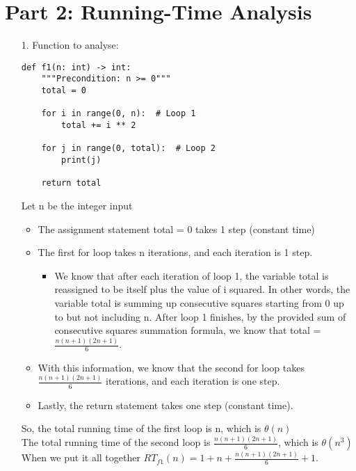 \documentclass[11pt]{article}
\begin{document}
\newpage


\section*{Part 2: Running-Time Analysis}

\begin{enumerate}
\item[1.]
Function to analyse:

\begin{verbatim}
def f1(n: int) -> int:
    """Precondition: n >= 0"""
    total = 0

    for i in range(0, n):  # Loop 1
        total += i ** 2

    for j in range(0, total):  # Loop 2
        print(j)

    return total
\end{verbatim}

Let n be the integer input 
\begin{itemize}
  \item The assignment statement total = 0 takes 1 step (constant time)
  \item The first for loop takes n iterations, and each iteration is 1 step. 
  \begin{itemize}
      \item We know that after each iteration of loop 1, the variable total is reassigned to be itself plus the value of i squared. In other words, the variable total is summing up consecutive squares starting from 0 up to but not including n. After loop 1 finishes, by the provided sum of consecutive squares summation formula, we know that total = $\frac{n(n+1)(2n+1)}{6}$. 
  \end{itemize}
  \item With this information, we know that the second for loop takes $\frac{n(n+1)(2n+1)}{6}$ iterations, and each iteration is one step.
  \item Lastly, the return statement takes one step (constant time). 
\end{itemize}

So, the total running time of the first loop is n, which is $\theta (n)$ \\
The total running time of the second loop is $\frac{n(n+1)(2n+1)}{6}$, which is $\theta (n^3)$ \\

When we put it all together $RT_{f1}(n) = 1 + n + \frac{n(n+1)(2n+1)}{6} + 1$. \\


\end{enumerate}
\end{document}
